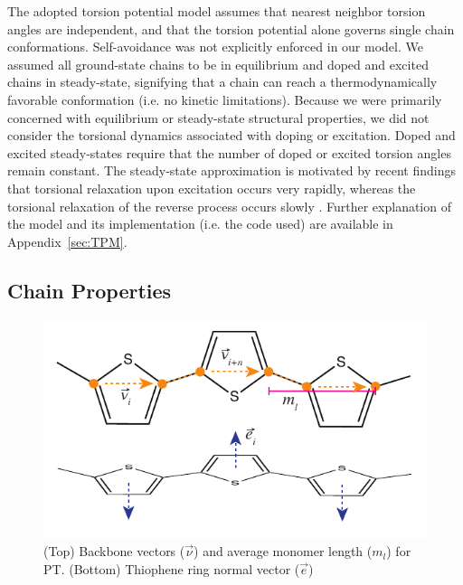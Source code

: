 The adopted torsion potential model assumes that nearest neighbor torsion angles are independent, and that the torsion potential alone governs single chain conformations. Self-avoidance was not explicitly enforced in our model. We assumed all ground-state chains to be in equilibrium and doped and excited chains in steady-state, signifying that a chain can reach a thermodynamically favorable conformation (i.e. no kinetic limitations). Because we were primarily concerned with equilibrium or steady-state structural properties, we did not consider the torsional dynamics associated with doping or excitation. Doped and excited steady-states require that the number of doped or excited torsion angles remain constant. The steady-state approximation is motivated by recent findings that torsional relaxation upon excitation occurs very rapidly, whereas the torsional relaxation of the reverse process occurs slowly \cite{Busby2011, Yu2016}. Further explanation of the model and its implementation (i.e. the code used) are available in Appendix~\ref{sec:TPM}.

\subsection{Chain Properties}

\begin{figure}
    \centering
    \includegraphics{figures/chap2/bond_vectors.pdf}
    \caption[Backbone Vector, Average Monomer Length, and Ring Normal Vector for PT]{(Top) Backbone vectors ($\Vec{\nu}$) and average monomer length ($m_l$) for PT. (Bottom) Thiophene ring normal vector ($\Vec{e}$)}
    \label{fig:pt_vecs}
\end{figure}

